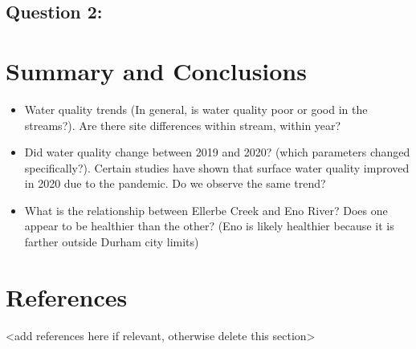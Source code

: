 \documentclass[
  12pt,
]{article}
\begin{document}
\hypertarget{question-2}{%
\subsection{Question 2:}\label{question-2}}

\newpage

\hypertarget{summary-and-conclusions}{%
\section{Summary and Conclusions}\label{summary-and-conclusions}}

\begin{itemize}
\item
  Water quality trends (In general, is water quality poor or good in the
  streams?). Are there site differences within stream, within year?
\item
  Did water quality change between 2019 and 2020? (which parameters
  changed specifically?). Certain studies have shown that surface water
  quality improved in 2020 due to the pandemic. Do we observe the same
  trend?
\item
  What is the relationship between Ellerbe Creek and Eno River? Does one
  appear to be healthier than the other? (Eno is likely healthier
  because it is farther outside Durham city limits)
\end{itemize}

\newpage

\hypertarget{references}{%
\section{References}\label{references}}

\textless add references here if relevant, otherwise delete this
section\textgreater{}
\end{document}
